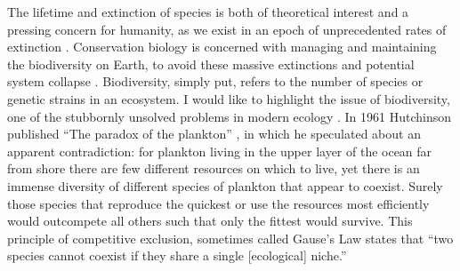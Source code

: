 The lifetime and extinction of species is both of theoretical interest and a pressing concern for humanity, as we exist in an epoch of unprecedented rates of extinction \cite{Saavedra2013}. 
Conservation biology is concerned with managing and maintaining the biodiversity on Earth, to avoid these massive extinctions and potential system collapse \cite{Shaffer1981,Pimm1988,Peterson1997,McKane2000,Saavedra2013,Kalyuzhny2014}. 
Biodiversity, simply put, refers to the number of species or genetic strains in an ecosystem. 
%
I would like to highlight the issue of biodiversity, one of the stubbornly unsolved problems in modern ecology \cite{May1999,Chesson2000,Pennisi2005,Kelly2008}. %
In 1961 Hutchinson published ``The paradox of the plankton'' \cite{Hutchinson1961}, in which he speculated about an apparent contradiction: for plankton living in the upper layer of the ocean far from shore there are few different resources on which to live, yet there is an immense diversity of different species of plankton that appear to coexist. 
Surely those species that reproduce the quickest or use the resources most efficiently would outcompete all others such that only the fittest would survive. 
This principle of competitive exclusion, sometimes called Gause's Law \cite{Gause1934} states that ``two species cannot coexist if they share a single [ecological] niche.''
